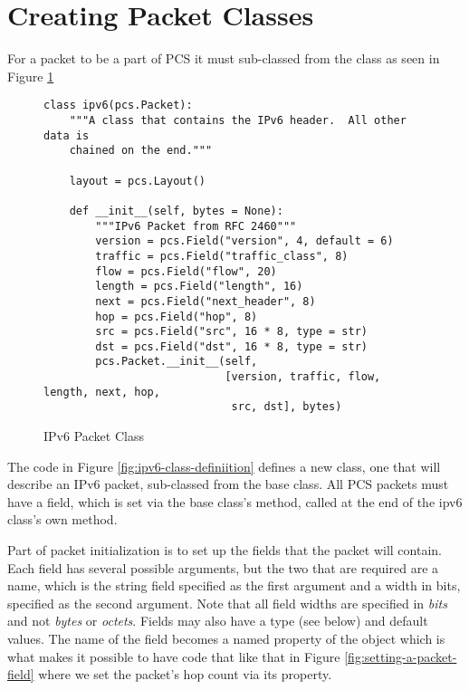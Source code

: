 \documentclass[11pt]{article}
\begin{document}
\section{Creating Packet Classes}

For a packet to be a part of PCS it must sub-classed from the 
class as seen in Figure \ref{}

\begin{figure}
  \centering
\begin{verbatim}
class ipv6(pcs.Packet):
    """A class that contains the IPv6 header.  All other data is
    chained on the end."""

    layout = pcs.Layout()

    def __init__(self, bytes = None):
        """IPv6 Packet from RFC 2460"""
        version = pcs.Field("version", 4, default = 6)
        traffic = pcs.Field("traffic_class", 8)
        flow = pcs.Field("flow", 20)
        length = pcs.Field("length", 16)
        next = pcs.Field("next_header", 8)
        hop = pcs.Field("hop", 8)
        src = pcs.Field("src", 16 * 8, type = str)
        dst = pcs.Field("dst", 16 * 8, type = str)
        pcs.Packet.__init__(self,
                            [version, traffic, flow, length, next, hop,
                             src, dst], bytes)
\end{verbatim}
  \caption{IPv6 Packet Class}
  \label{fig:ipv6-class-definition}
\end{figure}

The code in Figure \ref{fig:ipv6-class-definiition} defines a new
class, one that will describe an IPv6 packet, sub-classed from the
 base class.  All PCS packets must have a 
field, which is set via the base class's  method,
called at the end of the ipv6 class's own 
method.

Part of packet initialization is to set up the fields that the packet
will contain.  Each field has several possible arguments, but the two
that are required are a name, which is the string field specified as
the first argument and a width in bits, specified as the second
argument.  Note that all field widths are specified in \emph{bits} and
not \emph{bytes} or \emph{octets}.  Fields may also have a type (see
below) and default values.  The name of the field becomes a named
property of the object which is what makes it possible to have code
that like that in Figure \ref{fig:setting-a-packet-field} where we set
the packet's hop count via its  property.
\end{document}
